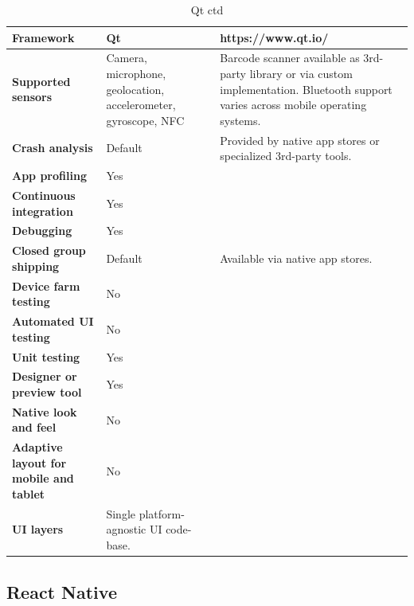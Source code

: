\documentclass[english,master,public,dept460,male,cpdeclaration,oneside]{diploma}
\begin{document}
\begin{table}[!h]
	\centering
	\caption{Qt ctd}
	\begin{tabular}{p{} | p{} | p{}}
		\toprule		
		\textbf{Framework} & \textbf{Qt} & https://www.qt.io/ \\
		\midrule
		\textbf{Supported sensors} & Camera, microphone, geolocation, accelerometer, gyroscope, NFC & Barcode scanner available as 3rd-party library or via custom implementation. Bluetooth support varies across mobile operating systems. \\			
		\midrule
		\textbf{Crash analysis} & Default & Provided by native app stores or specialized 3rd-party tools. \\			
		\midrule
		\textbf{App profiling} & Yes & \\			
		\midrule
		\textbf{Continuous integration} & Yes & \\			
		\midrule
		\textbf{Debugging} & Yes & \\			
		\midrule
		\textbf{Closed group shipping} & Default & Available via native app stores. \\			
		\midrule
		\textbf{Device farm testing} & No & \\			
		\midrule
		\textbf{Automated UI testing} & No & \\			
		\midrule
		\textbf{Unit testing} & Yes & \\			
		\midrule
		\textbf{Designer or preview tool} & Yes & \\			
		\midrule
		\textbf{Native look and feel} & No & \\			
		\midrule
		\textbf{Adaptive layout for mobile and tablet} & No & \\			
		\midrule		
		\textbf{UI layers} & Single platform-agnostic UI code-base. & \\			
		\midrule
	\end{tabular}
\end{table}

\clearpage
\subsection{React Native}
\end{document}
